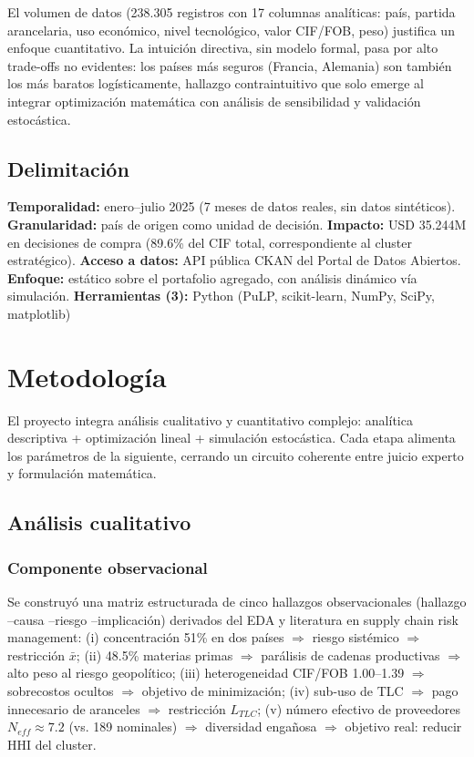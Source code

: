 \documentclass[11pt,a4paper]{article}
\begin{document}
El volumen de datos (238.305 registros con 17 columnas analíticas: país, partida arancelaria, uso económico, nivel tecnológico, valor CIF/FOB, peso) justifica un enfoque cuantitativo. La intuición directiva, sin modelo formal, pasa por alto trade-offs no evidentes: los países más seguros (Francia, Alemania) son también los más baratos logísticamente, hallazgo contraintuitivo que solo emerge al integrar optimización matemática con análisis de sensibilidad y validación estocástica.

\subsection{Delimitación}

\textbf{Temporalidad:} enero--julio 2025 (7 meses de datos reales, sin datos sintéticos). \textbf{Granularidad:} país de origen como unidad de decisión. \textbf{Impacto:} USD 35.244M en decisiones de compra (89.6\% del CIF total, correspondiente al cluster estratégico). \textbf{Acceso a datos:} API pública CKAN del Portal de Datos Abiertos. \textbf{Enfoque:} estático sobre el portafolio agregado, con análisis dinámico vía simulación. \textbf{Herramientas (3):} Python (PuLP, scikit-learn, NumPy, SciPy, matplotlib)

\section{Metodología}

El proyecto integra análisis cualitativo y cuantitativo complejo: analítica descriptiva + optimización lineal + simulación estocástica. Cada etapa alimenta los parámetros de la siguiente, cerrando un circuito coherente entre juicio experto y formulación matemática.

\subsection{Análisis cualitativo}

\subsubsection{Componente observacional}

Se construyó una matriz estructurada de cinco hallazgos observacionales (hallazgo --causa --riesgo --implicación) derivados del EDA y literatura en supply chain risk management: (i) concentración 51\% en dos países $\Rightarrow$ riesgo sistémico $\Rightarrow$ restricción $\bar{x}$; (ii) 48.5\% materias primas $\Rightarrow$ parálisis de cadenas productivas $\Rightarrow$ alto peso al riesgo geopolítico; (iii) heterogeneidad CIF/FOB 1.00--1.39 $\Rightarrow$ sobrecostos ocultos $\Rightarrow$ objetivo de minimización; (iv) sub-uso de TLC $\Rightarrow$ pago innecesario de aranceles $\Rightarrow$ restricción $L_{TLC}$; (v) número efectivo de proveedores $N_{eff} \approx 7.2$ (vs. 189 nominales) $\Rightarrow$ diversidad engañosa $\Rightarrow$ objetivo real: reducir HHI del cluster.
\end{document}
